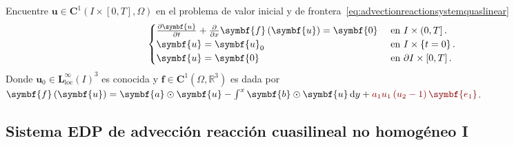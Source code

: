 Encuentre
\begin{math}
	\symbf{u}\in
	\symbf{C}^{1}\left(I\times\left[0,T\right],\Omega\right)
\end{math}
en el problema de valor inicial y de frontera~\eqref{eq:advectionreactionsystemquaslinear}
\begin{equation}\label{eq:advectionreactionsystemquaslinear}
	\begin{cases}
		\diffp{\symbf{u}}{t}+\diffp{}{x}\symbf{f}\left(\symbf{u}\right)=
		\symbf{0}     & \text{ en }I\times\left(0,T\right].          \\
		\symbf{u}                                                      =
		\symbf{u}_{0} & \text{ en }I\times\left\{t=0\right\}.        \\
		\symbf{u}                                                      =
		\symbf{0}     & \text{ en }\partial I\times\left[0,T\right].
	\end{cases}
\end{equation}
Donde
\begin{math}
	\symbf{u}_{0}\in
	{\symbf{L}^{\infty}_{\text{loc}}\left(I\right)}^{3}
\end{math}
es conocida y
\begin{math}
	\symbf{f}\in
	\symbf{C}^{1}\left(\Omega,\mathbb{R}^{3}\right)
\end{math}
es dada por
\begin{math}
	\symbf{f}\left(\symbf{u}\right)=
	\symbf{a}\odot\symbf{u}-
	\int^{x}\symbf{b}\odot\symbf{u}\dl y+
	\mathcolor{DarkRed}{a_{1}u_{1}\left(u_{2}-1\right)\symbf{e_{1}}}
\end{math}.

\subsection*{Sistema EDP de advección reacción cuasilineal no homogéneo I}


